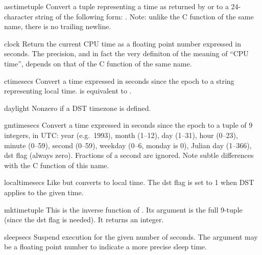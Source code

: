 \begin{funcdesc}{asctime}{tuple}
Convert a tuple representing a time as returned by  or
 to a 24-character string of the following form:
.  Note: unlike the C function of
the same name, there is no trailing newline.
\end{funcdesc}


\begin{funcdesc}{clock}{}
Return the current CPU time as a floating point number expressed in
seconds.  The precision, and in fact the very definiton of the meaning
of ``CPU time'', depends on that of the C function of the same name.
\end{funcdesc}


\begin{funcdesc}{ctime}{secs}
Convert a time expressed in seconds since the epoch to a string
representing local time.   is equivalent to
.
\end{funcdesc}

\begin{datadesc}{daylight}
Nonzero if a DST timezone is defined.
\end{datadesc}

\begin{funcdesc}{gmtime}{secs}
Convert a time expressed in seconds since the epoch to a tuple of 9
integers, in UTC: year (e.g.\ 1993), month (1--12), day (1--31), hour
(0--23), minute (0--59), second (0--59), weekday (0--6, monday is 0),
Julian day (1--366), dst flag (always zero).  Fractions of a second are
ignored.  Note subtle differences with the C function of this name.
\end{funcdesc}

\begin{funcdesc}{localtime}{secs}
Like  but converts to local time.  The dst flag is set
to 1 when DST applies to the given time.
\end{funcdesc}

\begin{funcdesc}{mktime}{tuple}
This is the inverse function of .  Its argument is the
full 9-tuple (since the dst flag is needed).  It returns an integer.
\end{funcdesc}

\begin{funcdesc}{sleep}{secs}
Suspend execution for the given number of seconds.  The argument may
be a floating point number to indicate a more precise sleep time.
\end{funcdesc}

